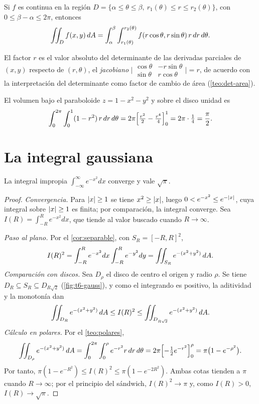 \begin{teorema}\label{teo:polares}
Si $f$ es continua en la región $D=\{\alpha\le\theta\le\beta,\ r_1(\theta)\le r\le r_2(\theta)\}$, con $0\le\beta-\alpha\le2\pi$, entonces
\[
\iint_Df(x,y)\,dA=\int_\alpha^\beta\int_{r_1(\theta)}^{r_2(\theta)}f(r\cos\theta,r\sin\theta)\,r\,dr\,d\theta .
\]
\end{teorema}

El factor $r$ es el valor absoluto del determinante de las derivadas parciales de $(x,y)$ respecto de $(r,\theta)$, el \emph{jacobiano} $\bigl|\begin{smallmatrix}\cos\theta&-r\sin\theta\\\sin\theta&r\cos\theta\end{smallmatrix}\bigr|=r$, de acuerdo con la interpretación del determinante como factor de cambio de área (\cref{teo:det-area}).

\begin{ejemplo}\label{ej:t6-polares}
El volumen bajo el paraboloide $z=1-x^2-y^2$ y sobre el disco unidad es
\[
\int_0^{2\pi}\int_0^1(1-r^2)\,r\,dr\,d\theta=2\pi\Bigl[\tfrac{r^2}{2}-\tfrac{r^4}{4}\Bigr]_0^1=2\pi\cdot\tfrac14=\frac\pi2 .
\]
\end{ejemplo}

\section{La integral gaussiana}

\begin{teorema}\label{teo:gauss}
La integral impropia $\int_{-\infty}^{\infty}e^{-x^2}dx$ converge y vale $\sqrt\pi$.
\end{teorema}

\begin{proof}
\emph{Convergencia.} Para $\lvert x\rvert\ge1$ se tiene $x^2\ge\lvert x\rvert$, luego $0<e^{-x^2}\le e^{-\lvert x\rvert}$, cuya integral sobre $\lvert x\rvert\ge1$ es finita; por comparación, la integral converge. Sea $I(R)=\int_{-R}^{R}e^{-x^2}dx$, que tiende al valor buscado cuando $R\to\infty$.

\emph{Paso al plano.} Por el \cref{cor:separable}, con $S_R=[-R,R]^2$,
\[
I(R)^2=\int_{-R}^{R}e^{-x^2}dx\int_{-R}^{R}e^{-y^2}dy=\iint_{S_R}e^{-(x^2+y^2)}\,dA .
\]
\emph{Comparación con discos.} Sea $D_\rho$ el disco de centro el origen y radio $\rho$. Se tiene $D_R\subseteq S_R\subseteq D_{R\sqrt2}$ (\cref{fig:t6-gauss}), y como el integrando es positivo, la aditividad y la monotonía dan
\[
\iint_{D_R}e^{-(x^2+y^2)}\,dA\le I(R)^2\le\iint_{D_{R\sqrt2}}e^{-(x^2+y^2)}\,dA .
\]
\emph{Cálculo en polares.} Por el \cref{teo:polares},
\[
\iint_{D_\rho}e^{-(x^2+y^2)}\,dA=\int_0^{2\pi}\int_0^{\rho}e^{-r^2}r\,dr\,d\theta=2\pi\Bigl[-\tfrac12e^{-r^2}\Bigr]_0^{\rho}=\pi\bigl(1-e^{-\rho^2}\bigr).
\]
Por tanto, $\pi(1-e^{-R^2})\le I(R)^2\le\pi(1-e^{-2R^2})$. Ambas cotas tienden a $\pi$ cuando $R\to\infty$; por el principio del sándwich, $I(R)^2\to\pi$ y, como $I(R)>0$, $I(R)\to\sqrt\pi$.
\end{proof}

